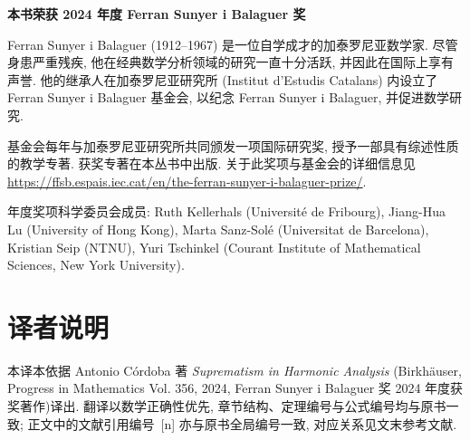 \documentclass[
  BookTitleCN={调和分析中的至上主义},
  BookTitleEN={Suprematism in Harmonic Analysis},
  OriginalAuthor={Antonio Córdoba},
  OriginalEdition={Progress in Mathematics Vol. 356},
  OriginalPublisher={Birkhäuser · Springer},
  OriginalYear={2024},
  Translator={数译},
  ModelUsed={GLM-5.3},
  TranslationDate={23 Aug 2026},
  BibStyle=numeric-comp
]{mathtranslation}
\theoremstyle{mtfang}
\theoremstyle{mtsong}
\theoremstyle{mtfang}
\theoremstyle{mtsong}
\numberwithin{equation}{chapter}
\begin{document}
\makecover

\frontmatter

\thispagestyle{plain}

\begin{center}
  \vspace*{1.5cm}
  {\Large\bfseries 本书荣获 2024 年度 Ferran Sunyer i Balaguer 奖}\\[1.2cm]
\end{center}

\noindent
Ferran Sunyer i Balaguer (1912--1967) 是一位自学成才的加泰罗尼亚数学家.
尽管身患严重残疾, 他在经典数学分析领域的研究一直十分活跃, 并因此在国际上享有声誉.
他的继承人在加泰罗尼亚研究所 (Institut d'Estudis Catalans) 内设立了 Ferran Sunyer i Balaguer 基金会,
以纪念 Ferran Sunyer i Balaguer, 并促进数学研究.

\smallskip
\noindent
基金会每年与加泰罗尼亚研究所共同颁发一项国际研究奖, 授予一部具有综述性质的教学专著.
获奖专著在本丛书中出版. 关于此奖项与基金会的详细信息见
\url{https://ffsb.espais.iec.cat/en/the-ferran-sunyer-i-balaguer-prize/}.

\smallskip
{} 年度奖项科学委员会成员:
Ruth Kellerhals (Université de Fribourg),
Jiang-Hua Lu (University of Hong Kong),
Marta Sanz-Solé (Universitat de Barcelona),
Kristian Seip (NTNU),
Yuri Tschinkel (Courant Institute of Mathematical Sciences, New York University).

\chapter*{译者说明}

本译本依据 Antonio Córdoba 著 \emph{Suprematism in Harmonic Analysis}
(Birkhäuser, Progress in Mathematics Vol. 356, 2024, Ferran Sunyer i Balaguer 奖 2024 年度获奖著作)译出.
翻译以数学正确性优先, 章节结构、定理编号与公式编号均与原书一致;
正文中的文献引用编号~[n] 亦与原书全局编号一致, 对应关系见文末参考文献.

\vspace{0.5cm}
\hfill \Translator

\hfill \TranslationDate

\tableofcontents

\mainmatter











\end{document}

